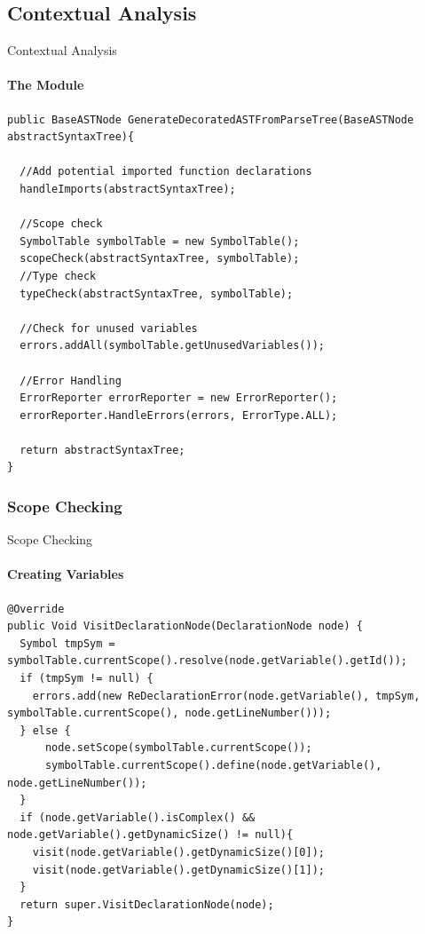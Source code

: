 \subsection{Contextual Analysis}
\begin{frame}[fragile]{Contextual Analysis}

\framesubtitle{The Module}

\begin{lstlisting}[caption=The method called from main performing Scope and Type checking and also reporting errors. ,frame=tlrb, basicstyle=\tiny, numbers=none ]
public BaseASTNode GenerateDecoratedASTFromParseTree(BaseASTNode abstractSyntaxTree){

  //Add potential imported function declarations
  handleImports(abstractSyntaxTree);

  //Scope check
  SymbolTable symbolTable = new SymbolTable();
  scopeCheck(abstractSyntaxTree, symbolTable);
  //Type check
  typeCheck(abstractSyntaxTree, symbolTable);

  //Check for unused variables
  errors.addAll(symbolTable.getUnusedVariables());

  //Error Handling
  ErrorReporter errorReporter = new ErrorReporter();
  errorReporter.HandleErrors(errors, ErrorType.ALL);

  return abstractSyntaxTree;
}
\end{lstlisting}
\end{frame}

\subsubsection{Scope Checking}
\begin{frame}[fragile]{Scope Checking}
\framesubtitle{Creating Variables}


\begin{lstlisting}[caption=The visit method for visiting a DeclarationNode in the Scope checker. ,frame=tlrb, basicstyle=\tiny, numbers=none]
@Override
public Void VisitDeclarationNode(DeclarationNode node) {
  Symbol tmpSym = symbolTable.currentScope().resolve(node.getVariable().getId());
  if (tmpSym != null) {
    errors.add(new ReDeclarationError(node.getVariable(), tmpSym, symbolTable.currentScope(), node.getLineNumber()));
  } else {
      node.setScope(symbolTable.currentScope());
      symbolTable.currentScope().define(node.getVariable(), node.getLineNumber());
  }
  if (node.getVariable().isComplex() && node.getVariable().getDynamicSize() != null){
    visit(node.getVariable().getDynamicSize()[0]);
    visit(node.getVariable().getDynamicSize()[1]);
  }
  return super.VisitDeclarationNode(node);
}
\end{lstlisting}

\end{frame}

